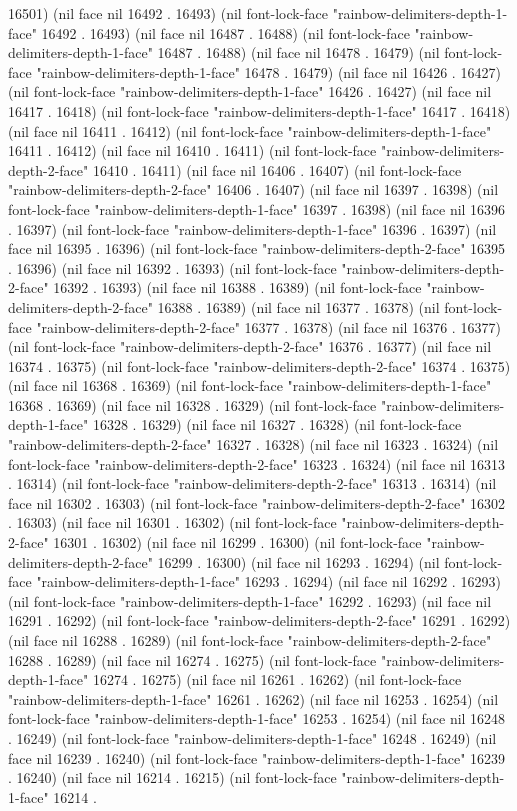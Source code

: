 16501) (nil face nil 16492 . 16493) (nil font-lock-face "rainbow-delimiters-depth-1-face" 16492 . 16493) (nil face nil 16487 . 16488) (nil font-lock-face "rainbow-delimiters-depth-1-face" 16487 . 16488) (nil face nil 16478 . 16479) (nil font-lock-face "rainbow-delimiters-depth-1-face" 16478 . 16479) (nil face nil 16426 . 16427) (nil font-lock-face "rainbow-delimiters-depth-1-face" 16426 . 16427) (nil face nil 16417 . 16418) (nil font-lock-face "rainbow-delimiters-depth-1-face" 16417 . 16418) (nil face nil 16411 . 16412) (nil font-lock-face "rainbow-delimiters-depth-1-face" 16411 . 16412) (nil face nil 16410 . 16411) (nil font-lock-face "rainbow-delimiters-depth-2-face" 16410 . 16411) (nil face nil 16406 . 16407) (nil font-lock-face "rainbow-delimiters-depth-2-face" 16406 . 16407) (nil face nil 16397 . 16398) (nil font-lock-face "rainbow-delimiters-depth-1-face" 16397 . 16398) (nil face nil 16396 . 16397) (nil font-lock-face "rainbow-delimiters-depth-1-face" 16396 . 16397) (nil face nil 16395 . 16396) (nil font-lock-face "rainbow-delimiters-depth-2-face" 16395 . 16396) (nil face nil 16392 . 16393) (nil font-lock-face "rainbow-delimiters-depth-2-face" 16392 . 16393) (nil face nil 16388 . 16389) (nil font-lock-face "rainbow-delimiters-depth-2-face" 16388 . 16389) (nil face nil 16377 . 16378) (nil font-lock-face "rainbow-delimiters-depth-2-face" 16377 . 16378) (nil face nil 16376 . 16377) (nil font-lock-face "rainbow-delimiters-depth-2-face" 16376 . 16377) (nil face nil 16374 . 16375) (nil font-lock-face "rainbow-delimiters-depth-2-face" 16374 . 16375) (nil face nil 16368 . 16369) (nil font-lock-face "rainbow-delimiters-depth-1-face" 16368 . 16369) (nil face nil 16328 . 16329) (nil font-lock-face "rainbow-delimiters-depth-1-face" 16328 . 16329) (nil face nil 16327 . 16328) (nil font-lock-face "rainbow-delimiters-depth-2-face" 16327 . 16328) (nil face nil 16323 . 16324) (nil font-lock-face "rainbow-delimiters-depth-2-face" 16323 . 16324) (nil face nil 16313 . 16314) (nil font-lock-face "rainbow-delimiters-depth-2-face" 16313 . 16314) (nil face nil 16302 . 16303) (nil font-lock-face "rainbow-delimiters-depth-2-face" 16302 . 16303) (nil face nil 16301 . 16302) (nil font-lock-face "rainbow-delimiters-depth-2-face" 16301 . 16302) (nil face nil 16299 . 16300) (nil font-lock-face "rainbow-delimiters-depth-2-face" 16299 . 16300) (nil face nil 16293 . 16294) (nil font-lock-face "rainbow-delimiters-depth-1-face" 16293 . 16294) (nil face nil 16292 . 16293) (nil font-lock-face "rainbow-delimiters-depth-1-face" 16292 . 16293) (nil face nil 16291 . 16292) (nil font-lock-face "rainbow-delimiters-depth-2-face" 16291 . 16292) (nil face nil 16288 . 16289) (nil font-lock-face "rainbow-delimiters-depth-2-face" 16288 . 16289) (nil face nil 16274 . 16275) (nil font-lock-face "rainbow-delimiters-depth-1-face" 16274 . 16275) (nil face nil 16261 . 16262) (nil font-lock-face "rainbow-delimiters-depth-1-face" 16261 . 16262) (nil face nil 16253 . 16254) (nil font-lock-face "rainbow-delimiters-depth-1-face" 16253 . 16254) (nil face nil 16248 . 16249) (nil font-lock-face "rainbow-delimiters-depth-1-face" 16248 . 16249) (nil face nil 16239 . 16240) (nil font-lock-face "rainbow-delimiters-depth-1-face" 16239 . 16240) (nil face nil 16214 . 16215) (nil font-lock-face "rainbow-delimiters-depth-1-face" 16214 . 